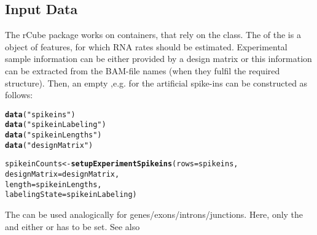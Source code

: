 \documentclass{article}\usepackage[]{graphicx}\usepackage[usenames,dvipsnames]{color}
\makeatletter
\newcommand{\hlstr}[1]{\textcolor[rgb]{0.192,0.494,0.8}{#1}}%
\newcommand{\hlstd}[1]{\textcolor[rgb]{0.345,0.345,0.345}{#1}}%
\newcommand{\hlkwb}[1]{\textcolor[rgb]{0.69,0.353,0.396}{#1}}%
\newcommand{\hlkwc}[1]{\textcolor[rgb]{0.333,0.667,0.333}{#1}}%
\newcommand{\hlkwd}[1]{\textcolor[rgb]{0.737,0.353,0.396}{\textbf{#1}}}%
\newenvironment{kframe}{%
 \def\at@end@of@kframe{}%
 \ifinner\ifhmode%
  \def\at@end@of@kframe{\end{minipage}}%
  \begin{minipage}{\columnwidth}%
 \fi\fi%
 \def\FrameCommand##1{\hskip\@totalleftmargin \hskip-\fboxsep
 \colorbox{shadecolor}{##1}\hskip-\fboxsep
     \hskip-\linewidth \hskip-\@totalleftmargin \hskip\columnwidth}%
 \MakeFramed {\advance\hsize-\width
   \@totalleftmargin\z@ \linewidth\hsize
   \@setminipage}}%
 {\par\unskip\endMakeFramed%
 \at@end@of@kframe}
\newenvironment{knitrout}{}{} %
\makeatother
\begin{document}
\subsection{Input Data}
The rCube package works on  containers, that rely on the
 class.
The  of the  is a  object of
features, for which RNA rates should be estimated. Experimental sample information
can be either provided by a design matrix or this information can be extracted from
the BAM-file names (when they fulfil the required structure).
Then, an empty ,e.g. for the artificial spike-ins can
be constructed as follows:
\begin{knitrout}
\color{fgcolor}\begin{kframe}
\begin{alltt}
\hlkwd{data}\hlstd{(}\hlstr{"spikeins"}\hlstd{)}
\hlkwd{data}\hlstd{(}\hlstr{"spikeinLabeling"}\hlstd{)}
\hlkwd{data}\hlstd{(}\hlstr{"spikeinLengths"}\hlstd{)}
\hlkwd{data}\hlstd{(}\hlstr{"designMatrix"}\hlstd{)}

\hlstd{spikeinCounts} \hlkwb{<-} \hlkwd{setupExperimentSpikeins}\hlstd{(}\hlkwc{rows}\hlstd{=spikeins,}
                                         \hlkwc{designMatrix}\hlstd{=designMatrix,}
                                         \hlkwc{length}\hlstd{=spikeinLengths,}
                                         \hlkwc{labelingState}\hlstd{=spikeinLabeling)}
\end{alltt}
\end{kframe}
\end{knitrout}
The  can be used analogically for genes/exons/introns/junctions. Here, only the  and either  or  has
to be set. See also %
\end{document}
